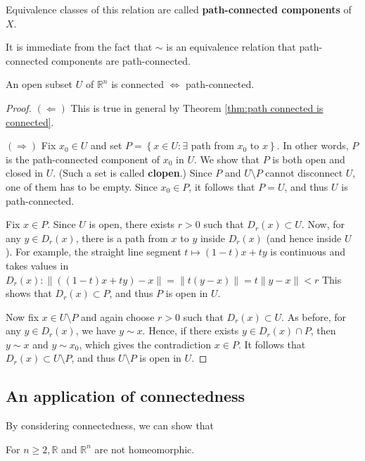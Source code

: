 \documentclass[a4paper]{article}
\begin{document}
\begin{definition}
    Equivalence classes of this relation are called \textbf{path-connected components} of $X$. 
\end{definition}
\begin{note}
    It is immediate from the fact that $\sim$ is an equivalence relation that path-connected components are path-connected.
\end{note}

\begin{theorem}\label{thm:Rn connected iff path-connected}
    An open subset $U$ of $\mathbb{R}^{n}$ is connected $\Longleftrightarrow$ path-connected.
\end{theorem}
\begin{proof}
    $(\Longleftarrow)$ This is true in general by Theorem \ref{thm:path connected is connected}.

$(\Longrightarrow)$ Fix $x_{0} \in U$ and set $P=\left\{x \in U: \exists\right.$ path from $x_{0}$ to $\left.x\right\}$. In other words, $P$ is the path-connected component of $x_{0}$ in $U$. We show that $P$ is both open and closed in $U$. (Such a set is called \textbf{clopen}.) Since $P$ and $U \setminus P$ cannot disconnect $U$, one of them has to be empty. Since $x_{0} \in P$, it follows that $P=U$, and thus $U$ is path-connected.

Fix $x \in P$. Since $U$ is open, there exists $r>0$ such that $D_{r}(x) \subset U$. Now, for any $y \in D_{r}(x)$, there is a path from $x$ to $y$ inside $D_{r}(x)$ (and hence inside $U$ ). For example, the straight line segment $t \mapsto(1-t) x+t y$ is continuous and takes values in $D_{r}(x):\|((1-t) x+t y)-x\|=\|t(y-x)\|=t\|y-x\|<r$ This shows that $D_{r}(x) \subset P$, and thus $P$ is open in $U$.

Now fix $x \in U \setminus P$ and again choose $r>0$ such that $D_{r}(x) \subset U$. As before, for any $y \in D_{r}(x)$, we have $y \sim x$. Hence, if there exists $y \in D_{r}(x) \cap P$, then $y \sim x$ and $y \sim x_{0}$, which gives the contradiction $x \in P$. It follows that $D_{r}(x) \subset U \setminus P$, and thus $U \setminus P$ is open in $U$.
\end{proof}

\subsection{An application of connectedness}
By considering connectedness, we can show that
\begin{theorem}\label{th,:R, Rn not homeo}
    For $n \geqslant 2, \mathbb{R}$ and $\mathbb{R}^{n}$ are not homeomorphic.
\end{theorem}
\end{document}
